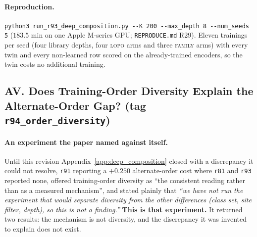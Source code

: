 \paragraph{Reproduction.} \texttt{python3 run\_r93\_deep\_composition.py -{}-K 200 -{}-max\_depth 8 -{}-num\_seeds 5} ($183.5$ min on one Apple M-series GPU; \texttt{REPRODUCE.md} R29). Eleven trainings per seed (four library depths, four \textsc{lopo} arms and three \textsc{family} arms) with every twin and every non-learned row scored on the already-trained encoders, so the twin costs no additional training.


\subsection*{AV. Does Training-Order Diversity Explain the Alternate-Order Gap? (tag \texttt{r94\_order\_diversity})}

\paragraph{An experiment the paper named against itself.} Until this revision Appendix~\ref{app:deep_composition} closed with a discrepancy it could not resolve, \texttt{r91} reporting a $+0.250$ alternate-order cost where \texttt{r81} and \texttt{r93} reported none, offered training-order diversity as ``the consistent reading rather than as a measured mechanism'', and stated plainly that \emph{``we have not run the experiment that would separate diversity from the other differences (class set, site filter, depth), so this is not a finding.''} \textbf{This is that experiment.} It returned two results: the mechanism is not diversity, and the discrepancy it was invented to explain does not exist.

